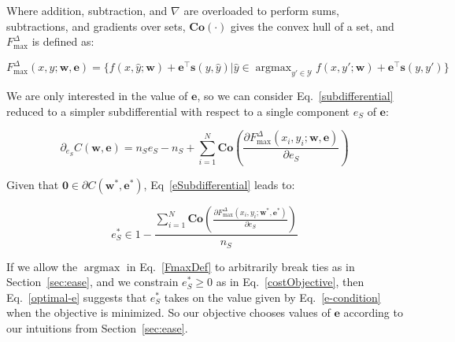 \documentclass{article} %
\DeclareMathOperator*{\argmax}{argmax}
\newcommand{\bmcomment}[1]{\textcolor{blue}{\textsc{\textbf{[#1 --bm]}}}}
\newcommand{\nascomment}[1]{\textcolor{red}{\textsc{\textbf{[#1 --nas]}}}}
\begin{document}
Where addition, subtraction, and $\nabla$ are overloaded to perform sums,
subtractions, and gradients over sets, 
$\mathbf{Co}(\cdot)$ gives the convex hull of a
set, and $F^{\Delta}_{\max}$ is defined as:

\begin{equation}
\label{FmaxDef}
F^{\Delta}_{\max}(x,y;\mathbf{w},\mathbf{e}) = 
\{ f(x, \hat{y} ; \mathbf{w}) +
\mathbf{e}^\top \mathbf{s}(y, \hat{y})
| \hat{y}\in\argmax_{y' \in \mathcal{Y}} f(x, y' ; \mathbf{w}) +
\mathbf{e}^\top \mathbf{s}(y, y') \}
\end{equation}

We are only interested in the value of $\mathbf{e}$, so
we can consider Eq.~\ref{subdifferential} reduced to 
a simpler subdifferential 
with respect to a single component $e_S$ of $\mathbf{e}$:

\begin{equation}
\label{eSubdifferential}
\partial_{e_S} C(\mathbf{w},\mathbf{e}) = 
n_S e_S -n_S+
\sum_{i=1}^N 
\mathbf{Co}(\frac{\partial 
F^{\Delta}_{\max}(x_i,y_i;\mathbf{w},\mathbf{e})}{\partial e_S})
\end{equation}

Given that $\mathbf{0}\in \partial C(\mathbf{w}^*,\mathbf{e}^*)$,
Eq~\ref{eSubdifferential} leads to:

\begin{equation}
\label{optimal-e}
e_S^*\in 1 - \frac{\sum_{i=1}^N 
\mathbf{Co}(\frac{\partial 
F^{\Delta}_{\max}(x_i,y_i;\mathbf{w}^*,\mathbf{e}^*)}{\partial e_S})}{n_S}
\end{equation}

If we allow the $\argmax$ in Eq.~\ref{FmaxDef} to arbitrarily break
ties as in Section~\ref{sec:ease}, and we constrain $e^*_S\geq 0$ as in
Eq.~\ref{costObjective}, then Eq.~\ref{optimal-e} suggests that 
$e^*_S$ takes on the value given by Eq.~\ref{e-condition} when the
objective is minimized.  So our objective chooses values of 
$\mathbf{e}$ according to our intuitions from Section~\ref{sec:ease}.


\end{document}
